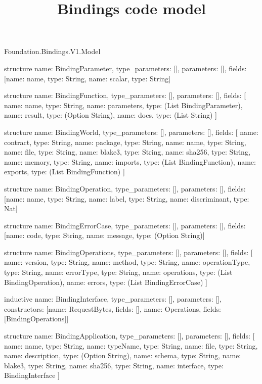 \begin{lexlean}{Foundation.Bindings.V1.Model}
\title{Bindings code model}
\begin{semanticmodule}
structure{
  name: BindingParameter,
  type_parameters: [],
  parameters: [],
  fields: [{name: name, type: String}, {name: scalar, type: String}]
}

structure{
  name: BindingFunction,
  type_parameters: [],
  parameters: [],
  fields: [
    {name: name, type: String},
    {name: parameters, type: (List BindingParameter)},
    {name: result, type: (Option String)},
    {name: docs, type: (List String)}
  ]
}

structure{
  name: BindingWorld,
  type_parameters: [],
  parameters: [],
  fields: [
    {name: contract, type: String},
    {name: package, type: String},
    {name: name, type: String},
    {name: file, type: String},
    {name: blake3, type: String},
    {name: sha256, type: String},
    {name: memory, type: String},
    {name: imports, type: (List BindingFunction)},
    {name: exports, type: (List BindingFunction)}
  ]
}

structure{
  name: BindingOperation,
  type_parameters: [],
  parameters: [],
  fields: [{name: name, type: String}, {name: label, type: String}, {name: discriminant, type: Nat}]
}

structure{
  name: BindingErrorCase,
  type_parameters: [],
  parameters: [],
  fields: [{name: code, type: String}, {name: message, type: (Option String)}]
}

structure{
  name: BindingOperations,
  type_parameters: [],
  parameters: [],
  fields: [
    {name: version, type: String},
    {name: method, type: String},
    {name: operationType, type: String},
    {name: errorType, type: String},
    {name: operations, type: (List BindingOperation)},
    {name: errors, type: (List BindingErrorCase)}
  ]
}

inductive{
  name: BindingInterface,
  type_parameters: [],
  parameters: [],
  constructors: [{name: RequestBytes, fields: []}, {name: Operations, fields: [BindingOperations]}]
}

structure{
  name: BindingApplication,
  type_parameters: [],
  parameters: [],
  fields: [
    {name: name, type: String},
    {name: typeName, type: String},
    {name: file, type: String},
    {name: description, type: (Option String)},
    {name: schema, type: String},
    {name: blake3, type: String},
    {name: sha256, type: String},
    {name: interface, type: BindingInterface}
  ]
}


\end{semanticmodule}
\end{lexlean}

